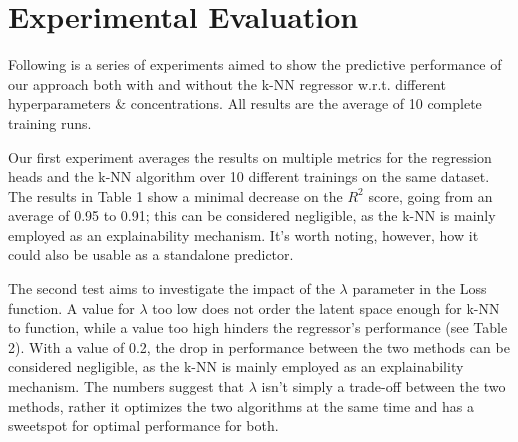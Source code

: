 \documentclass[11pt,twoside]{article}
\begin{document}
\section{Experimental Evaluation}
Following is a series of experiments aimed to show the predictive performance of our approach both with and without the k-NN regressor w.r.t. different hyperparameters \& concentrations. All results are the average of 10 complete training runs.

Our first experiment averages the results on multiple metrics for the regression heads and the k-NN algorithm over 10 different trainings on the same dataset. The results in Table 1 show a minimal decrease on the $R^2$ score, going from an average of 0.95 to 0.91; this can be considered negligible, as the k-NN is mainly employed as an explainability mechanism. It's worth noting, however, how it could also be usable as a standalone predictor. 

The second test aims to investigate the impact of the $\lambda$ parameter in the Loss function.
A value for $\lambda$ too low does not order the latent space enough for k-NN to function, while a value too high hinders the regressor’s performance (see Table 2). With a value of 0.2, the drop in performance between the two methods can be considered negligible, as the k-NN is mainly employed as an explainability mechanism. 
The numbers suggest that $\lambda$ isn't simply a trade-off between the two methods, rather it optimizes the two algorithms at the same time and has a sweetspot for optimal performance for both.
\end{document}
